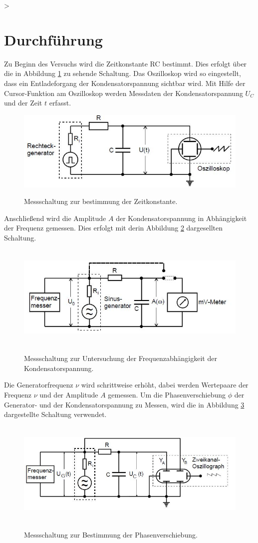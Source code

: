 >\section{Durchführung}
Zu Beginn des Versuchs wird die Zeitkonstante RC bestimmt. Dies erfolgt über die in
Abbildung \ref{fig:RC2} zu sehende Schaltung. Das Oszilloskop wird so eingestellt, dass
ein Entladeforgang der Kondensatorspannung sichtbar wird. Mit Hilfe der
Cursor-Funktion am Oszilloskop werden Messdaten der Kondensatorspannung $U_{C}$ und
der Zeit $t$ erfasst.
\begin{figure}[H]
  \centering
  \includegraphics[width=13cm]{RC2.JPG}
  \caption{Messschaltung zur bestimmung der Zeitkonstante.}
  \cite{skript}
  \label{fig:RC2}
\end{figure}
\label{sec:Durchführung}
\noindent Anschließend wird die Amplitude $A$ der Kondensatorspannung in Abhängigkeit der
Frequenz gemessen. Dies erfolgt mit derin Abbildung \ref{fig:RC3} dargesellten Schaltung.
\begin{figure}[H]
  \centering
  \includegraphics[height=5cm]{RC3.JPG}
  \caption{Messschaltung zur Untersuchung der Frequenzabhängigkeit der Kondensatorspannung.}
  \cite{skript}
  \label{fig:RC3}
\end{figure}
\noindent Die Generatorfrequenz $\nu$ wird schrittweise erhöht, dabei werden Wertepaare der
Frequenz $\nu$ und der Amplitude $A$ gemessen.
Um die Phasenverschiebung $\phi$ der Generator- und der Kondensatorspannung zu Messen,
wird die in Abbildung \ref{fig:RC4} dargestellte Schaltung verwendet.
\begin{figure}[H]
  \centering
  \includegraphics[height=5cm]{RC4.JPG}
  \caption{Messschaltung zur Bestimmung der Phasenverschiebung.}
  \cite{skript}
  \label{fig:RC4}
\end{figure}
